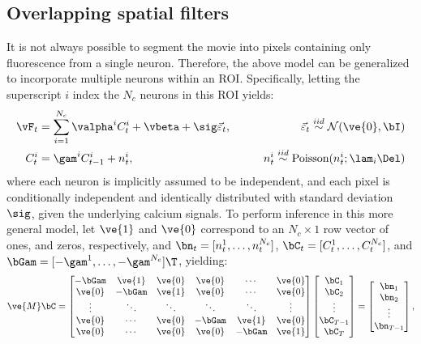 \subsection{Overlapping spatial filters} \label{sec:methods:overlapping}

It is not always possible to segment the movie into pixels containing only fluorescence from a single neuron.  Therefore, the above model can be generalized to incorporate multiple neurons within an ROI.   Specifically, letting the superscript $i$ index the $N_c$ neurons in this ROI yields:  
\begin{align} \label{eq:overlapping}
\vF_t &= \sum_{i=1}^{N_c}\valpha^i C^i_t + \vbeta +  \sig\vec{\varepsilon}_t, \qquad &\vec{\varepsilon}_t \overset{iid}{\sim} \mathcal{N}(\ve{0},\bI)   \\
C^i_t &= \gam^i C^i_{t-1} + n^i_t, & n^i_t \overset{iid}{\sim} \text{Poisson}(n^i_t; \lam_i \Del)
\end{align}
\noindent where each neuron is implicitly assumed to be independent, and each pixel is conditionally independent and identically distributed with standard deviation $\sig$, given the underlying calcium signals.  To perform inference in this more general model, let $\ve{1}$ and $\ve{0}$ correspond to an $N_c \times 1$ row vector of ones, and zeros, respectively, and $\bn_t=[n^1_t, \ldots, n^{N_c}_t]$, $\bC_t=[C^1_t, \ldots, C^{N_c}_t]$, and $\bGam=[-\gam^1, \ldots, -\gam^{N_c}]\T$, yielding:
\begin{align} \label{eq:M2}
\ve{M} \bC = %
\begin{bmatrix}
-\bGam & \ve{1} & \ve{0} & \ve{0} & \cdots & \ve{0} \\
\ve{0} & -\bGam & \ve{1} & \ve{0} & \cdots  & \ve{0} \\
\vdots & \ddots & \ddots & \ddots & \ddots & \vdots  \\
\ve{0} & \cdots & \ve{0}  & -\bGam & \ve{1} & \ve{0} \\
\ve{0} & \cdots & \ve{0} & \ve{0} & -\bGam & \ve{1}
\end{bmatrix}
\begin{bmatrix}
\bC_1 \\ \bC_2  \\  \vdots \\ \bC_{T-1} \\ \bC_T  
\end{bmatrix}
= 
\begin{bmatrix}
\bn_1 \\ \bn_2 \\ \vdots \\ \bn_{T-1}
\end{bmatrix}
,%
\end{align}
